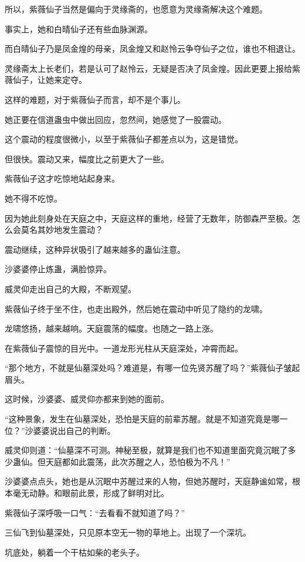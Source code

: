 \begin{this_body}
所以，紫薇仙子当然是偏向于灵缘斋的，也愿意为灵缘斋解决这个难题。

事实上，她和白晴仙子还有些血脉渊源。

而白晴仙子乃是凤金煌的母亲，凤金煌又和赵怜云争夺仙子之位，谁也不相退让。

灵缘斋太上长老们，若是认可了赵怜云，无疑是否决了凤金煌。因此更要上报给紫薇仙子，让她来定夺。

这样的难题，对于紫薇仙子而言，却不是个事儿。

她正要在信道蛊虫中做出回应，忽然间，她感觉了一股震动。

这个震动的程度很微小，以至于紫薇仙子都差点以为，这是错觉。

但很快。震动又来，幅度比之前更大了一些。

紫薇仙子这才吃惊地站起身来。

她不得不吃惊。

因为她此刻身处在天庭之中，天庭这样的重地，经营了无数年，防御森严至极。怎么会莫名其妙地发生震动？

震动继续，这种异状吸引了越来越多的蛊仙注意。

沙婆婆停止炼蛊，满脸惊异。

威灵仰走出自己的大殿，不断观望。

紫薇仙子终于坐不住，也走出殿外，然后她在震动中听见了隐约的龙啸。

龙啸悠扬，越来越响。天庭震荡的幅度。也随之一路上涨。

在紫薇仙子震惊的目光中。一道龙形光柱从天庭深处，冲霄而起。

“那个地方，不就是仙墓深处吗？难道是，有哪一位先贤苏醒了吗？”紫薇仙子皱起眉头。

这时候，沙婆婆、威灵仰亦都来到她的面前。

“这种景象，发生在仙墓深处，恐怕是天庭的前辈苏醒。就是不知道究竟是哪一位？”沙婆婆说出自己的判断。

威灵仰则道：“仙墓深不可测。神秘至极，就算是我们也不知道里面究竟沉眠了多少蛊仙。但天庭都如此震荡，此次苏醒之人，恐怕极为不凡！”

沙婆婆点点头，她也是从沉眠中苏醒过来的人物，但她苏醒时，天庭静谧如常，根本毫无动静。和眼前此景，形成了鲜明对比。

紫薇仙子深呼吸一口气：“去看看不就知道了吗？”

三仙飞到仙墓深处，只见原本空无一物的草地上。出现了一个深坑。

坑底处，躺着一个干枯如柴的老头子。


\end{this_body}
